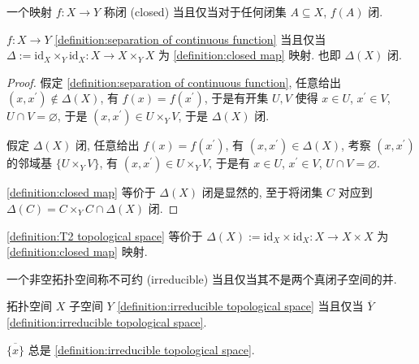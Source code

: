 \begin{definition}[闭映射]
    \label {definition:closed map}
    一个映射 \(f : X \to Y\) 称闭 (closed) 当且仅当对于任何闭集 \(A \subseteq X\), \(f (A)\) 闭.
\end{definition}

\begin{lemma}
    \(f : X \to Y\) \ref{definition:separation of continuous function} 当且仅当 \(\Delta := \mathrm{id}_X \times_Y \mathrm{id}_X : X \to X \times_Y X\) 为 \ref{definition:closed map} 映射.
    也即 \(\Delta (X)\) 闭.

    \begin{proof}
        假定 \ref{definition:separation of continuous function}, 任意给出 \((x,x^\prime) \notin \Delta (X)\), 有 \(f (x) = f (x^\prime)\), 
        于是有开集 \(U,V\) 使得 \(x \in U\), \(x^\prime \in V\), \(U \cap V = \varnothing\), 于是 \((x,x^\prime) \in U \times_Y V\), 于是 \(\Delta (X)\) 闭.

        假定 \(\Delta (X)\) 闭, 任意给出 \(f (x) = f (x^\prime)\), 有 \((x,x^\prime) \in \Delta (X)\), 考察 \((x,x^\prime)\)
        的邻域基 \(\{U \times_Y V\}\), 有 \((x,x^\prime) \in U \times_Y V\), 于是有 \(x \in U\), \(x^\prime \in V\), \(U \cap V = \varnothing\).

        \ref{definition:closed map} 等价于 \(\Delta (X)\) 闭是显然的, 至于将闭集 \(C\) 对应到 \(\Delta (C) = C \times_Y C \cap \Delta (X)\) 闭.
    \end{proof}
\end{lemma}

\begin{corollary}
    \ref{definition:T2 topological space} 等价于 \(\Delta (X) := \mathrm{id}_X \times \mathrm{id}_X : X \to X \times X\) 为 \ref{definition:closed map} 映射.
\end{corollary}

\begin{definition}[不可约]
    \label {definition:irreducible topological space}
    一个非空拓扑空间称不可约 (irreducible) 当且仅当其不是两个真闭子空间的并.
\end{definition}

\begin{lemma}
    拓扑空间 \(X\) 子空间 \(Y\) \ref{definition:irreducible topological space} 当且仅当 \(\overline{Y}\) \ref{definition:irreducible topological space}.
\end{lemma}

\begin{lemma}
    \(\overline{\{x\}}\) 总是 \ref{definition:irreducible topological space}.
\end{lemma}

